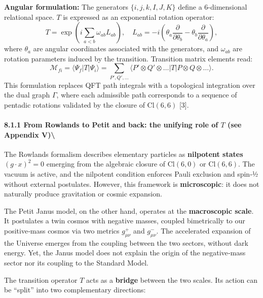 \documentclass[11pt]{article}
\let\oldmathcal\mathcal
\renewcommand{\mathcal}[1]{\oldmathcal{#1}}
\begin{document}
\textbf{Angular formulation:} The generators \(\{i,j,k,I,J,K\}\) define
a 6-dimensional relational space. \(T\) is expressed as an exponential
rotation operator: \[
T = \exp\left( i \sum_{a<b} \omega_{ab} L_{ab} \right), \quad L_{ab} = -i\left( \theta_a \frac{\partial}{\partial \theta_b} - \theta_b \frac{\partial}{\partial \theta_a} \right),
\] where \(\theta_a\) are angular coordinates associated with the
generators, and \(\omega_{ab}\) are rotation parameters induced by the
transition. Transition matrix elements read: \[
\mathcal{M}_{fi} = \langle \Psi_f | T | \Psi_i \rangle = \sum_{P',Q',\dots} \langle P' \otimes Q' \otimes \dots | T | P \otimes Q \otimes \dots \rangle.
\] This formulation replaces QFT path integrals with a topological
integration over the dual graph \(\Gamma\), where each admissible path
corresponds to a sequence of pentadic rotations validated by the closure
of \(\text{Cl}(6,6)\) {[}3{]}.

\hypertarget{from-rowlands-to-petit-and-back-the-unifying-role-of-t-see-appendix-v}{%
\paragraph{\texorpdfstring{8.1.1 From Rowlands to Petit and back: the
unifying role of \(T\) (see Appendix
V)\textbackslash{}}{8.1.1 From Rowlands to Petit and back: the unifying role of T (see Appendix V)\textbackslash{}}}\label{from-rowlands-to-petit-and-back-the-unifying-role-of-t-see-appendix-v}}

The Rowlands formalism describes elementary particles as
\textbf{nilpotent states} \((g \cdot x)^2 = 0\) emerging from the
algebraic closure of \(\mathrm{Cl}(6,0)\) or \(\mathrm{Cl}(6,6)\). The
vacuum is active, and the nilpotent condition enforces Pauli exclusion
and spin‑½ without external postulates. However, this framework is
\textbf{microscopic}: it does not naturally produce gravitation or
cosmic expansion.

The Petit Janus model, on the other hand, operates at the
\textbf{macroscopic scale}. It postulates a twin cosmos with negative
masses, coupled bimetrically to our positive‑mass cosmos via two metrics
\(g_{\mu\nu}^+\) and \(g_{\mu\nu}^-\). The accelerated expansion of the
Universe emerges from the coupling between the two sectors, without dark
energy. Yet, the Janus model does not explain the origin of the
negative‑mass sector nor its coupling to the Standard Model.

The transition operator \(T\) acts as a \textbf{bridge} between the two
scales. Its action can be ``split'' into two complementary directions:
\end{document}
